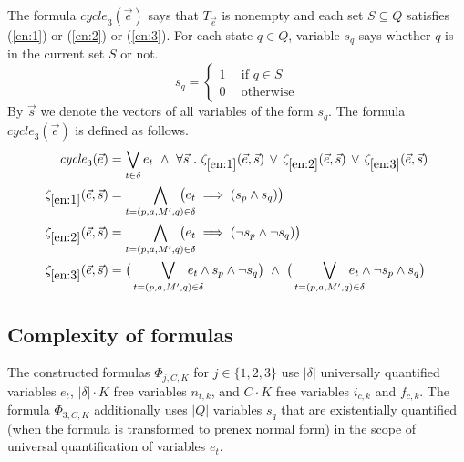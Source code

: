 \documentclass[a4paper,UKenglish,cleveref,autoref,thm-restate]{lipics-v2021}
\newcommand{\mcycle}{\mathit{cycle}}
\newcommand{\Te}{T_{\vec{e}}}
\begin{document}
The formula $\mcycle_3(\vec{e})$ says that $\Te$ is nonempty and each
set $S\subseteq Q$ satisfies (\ref{en:1}) or (\ref{en:2}) or
(\ref{en:3}).  For each state $q\in Q$, variable $s_q$ says whether
$q$ is in the current set $S$ or not.
\[s_q=\left\{
    \begin{array}{ll}
      1~~ & \textrm{if }q\in S\\[.5ex]
      0 & \textrm{otherwise}    
    \end{array}\right.
\]
By $\vec{s}$ we denote the vectors of all variables of the form $s_q$.
The formula $\mcycle_3(\vec{e})$ is defined as follows.
\begin{align*}
  \mcycle_3(\vec{e})
  &=\bigvee_{t\in\delta}e_t~\wedge~\forall\vec{s}~.~\zeta_{\ref{en:1}}(\vec{e},\vec{s})\,\vee\,
    \zeta_{\ref{en:2}}(\vec{e},\vec{s})\,\vee\,
    \zeta_{\ref{en:3}}(\vec{e},\vec{s})\\ %
  \zeta_{\ref{en:1}}(\vec{e},\vec{s}) &= \bigwedge_{t=(p,a,M',q)\in\delta}\hspace{-5mm}\big(e_t\implies (s_p\wedge s_q)\big)\\
  \zeta_{\ref{en:2}}(\vec{e},\vec{s}) &= \bigwedge_{t=(p,a,M',q)\in\delta}\hspace{-5mm}\big(e_t\implies (\neg s_p\wedge \neg s_q)\big)\\
  \zeta_{\ref{en:3}}(\vec{e},\vec{s}) &= \big(\bigvee_{t=(p,a,M',q)\in\delta}\hspace{-5mm}e_t\wedge s_p\wedge \neg s_q\big) ~\wedge~
  \big(\bigvee_{t=(p,a,M',q)\in\delta}\hspace{-5mm}e_t\wedge \neg s_p\wedge s_q\big)
\end{align*}

\subsection{Complexity of formulas}
The constructed formulas $\Phi_{j,C,K}$ for $j\in\{1,2,3\}$ use
$|\delta|$ universally quantified variables $e_t$, $|\delta|\cdot K$
free variables $n_{t,k}$, and $C\cdot K$ free variables $i_{c,k}$ and
$f_{c,k}$. The formula $\Phi_{3,C,K}$ additionally uses $|Q|$
variables $s_q$ that are existentially quantified (when the formula is
transformed to prenex normal form) in the scope of universal
quantification of variables $e_t$.
\end{document}
